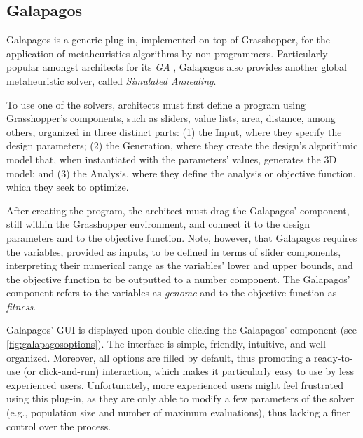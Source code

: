 	
	\subsection{Galapagos}
	\label{subsec:galapagos}
	Galapagos is a generic plug-in, implemented on top of Grasshopper, for the application of metaheuristics algorithms by non-programmers. 
	Particularly popular amongst architects for its \textit{\ac{GA}} \cite{Wortmann2017ADO}, Galapagos also provides another global metaheuristic solver, called \textit{Simulated Annealing}. 
	
	To use one of the solvers, architects must first define a program using Grasshopper's components, such as sliders, value lists, area, distance, among others, organized in three distinct parts: (1) the Input, where they specify the design parameters; (2) the Generation, where they create the design's algorithmic model that, when instantiated with the parameters' values, generates the 3D model; and (3) the Analysis, where they define the analysis or objective function, which they seek to optimize. 
	
	After creating the program, the architect must drag the Galapagos' component, still within the Grasshopper environment, and connect it to the design parameters and to the objective function. Note, however, that Galapagos requires the variables, provided as inputs, to be defined in terms of slider components, interpreting their numerical range as the variables' lower and upper bounds, and the objective function to be outputted to a number component. The Galapagos' component refers to the variables as \textit{genome} and to the objective function as \textit{fitness}.
	
	Galapagos' \ac{GUI} is displayed upon double-clicking the Galapagos' component (see \cref{fig:galapagosoptions}). The interface is simple, friendly, intuitive, and well-organized. Moreover, all options are filled by default, thus promoting a ready-to-use (or click-and-run) interaction, which makes it particularly easy to use by less experienced users. Unfortunately, more experienced users might feel frustrated using this plug-in, as they are only able to modify a few parameters of the solver (e.g., population size and number of maximum evaluations), thus lacking a finer control over the process. 
	
